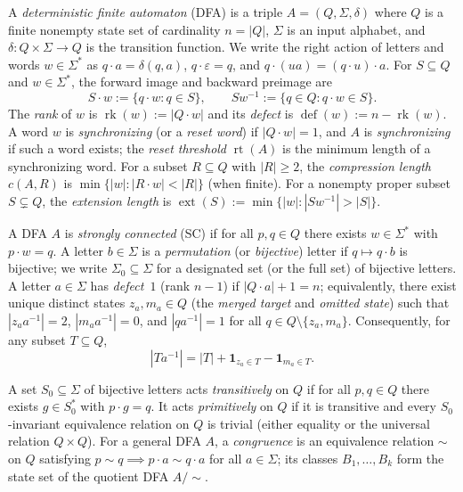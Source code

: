 \documentclass[11pt,a4paper]{article}
\theoremstyle{definition}
\theoremstyle{remark}
\newcommand{\rt}{\operatorname{rt}}
\newcommand{\ext}{\operatorname{ext}}
\newcommand{\rk}{\operatorname{rk}}
\newcommand{\defct}{\operatorname{def}}
\newcommand{\one}{\mathbf{1}}
\begin{document}
A \emph{deterministic finite automaton} (DFA) is a triple $A = (Q, \Sigma, \delta)$ where $Q$ is a finite nonempty state set of cardinality $n = |Q|$, $\Sigma$ is an input alphabet, and $\delta : Q \times \Sigma \to Q$ is the transition function. We write the right action of letters and words $w \in \Sigma^*$ as $q \cdot a = \delta(q, a)$, $q \cdot \varepsilon = q$, and $q \cdot (ua) = (q \cdot u) \cdot a$. For $S \subseteq Q$ and $w \in \Sigma^*$, the forward image and backward preimage are
\[
  S \cdot w := \{q \cdot w : q \in S\}, \qquad S w^{-1} := \{q \in Q : q \cdot w \in S\}.
\]
The \emph{rank} of $w$ is $\rk(w) := |Q \cdot w|$ and its \emph{defect} is $\defct(w) := n - \rk(w)$. A word $w$ is \emph{synchronizing} (or a \emph{reset word}) if $|Q \cdot w| = 1$, and $A$ is \emph{synchronizing} if such a word exists; the \emph{reset threshold} $\rt(A)$ is the minimum length of a synchronizing word. For a subset $R \subseteq Q$ with $|R| \ge 2$, the \emph{compression length} $c(A, R)$ is $\min\{|w| : |R \cdot w| < |R|\}$ (when finite). For a nonempty proper subset $S \subsetneq Q$, the \emph{extension length} is $\ext(S) := \min\{|w| : |S w^{-1}| > |S|\}$.

A DFA $A$ is \emph{strongly connected} (SC) if for all $p, q \in Q$ there exists $w \in \Sigma^*$ with $p \cdot w = q$. A letter $b \in \Sigma$ is a \emph{permutation} (or \emph{bijective}) letter if $q \mapsto q \cdot b$ is bijective; we write $\Sigma_0 \subseteq \Sigma$ for a designated set (or the full set) of bijective letters. A letter $a \in \Sigma$ has \emph{defect~$1$} (rank $n - 1$) if $|Q \cdot a| + 1 = n$; equivalently, there exist unique distinct states $z_a, m_a \in Q$ (the \emph{merged target} and \emph{omitted state}) such that $|z_a a^{-1}| = 2$, $|m_a a^{-1}| = 0$, and $|q a^{-1}| = 1$ for all $q \in Q \setminus \{z_a, m_a\}$. Consequently, for any subset $T \subseteq Q$,
\begin{equation}\label{eq:defect1-preimage}
  |T a^{-1}| = |T| + \one_{z_a \in T} - \one_{m_a \in T}.
\end{equation}

A set $S_0 \subseteq \Sigma$ of bijective letters acts \emph{transitively} on $Q$ if for all $p, q \in Q$ there exists $g \in S_0^*$ with $p \cdot g = q$. It acts \emph{primitively} on $Q$ if it is transitive and every $S_0$-invariant equivalence relation on $Q$ is trivial (either equality or the universal relation $Q \times Q$). For a general DFA $A$, a \emph{congruence} is an equivalence relation $\sim$ on $Q$ satisfying $p \sim q \implies p \cdot a \sim q \cdot a$ for all $a \in \Sigma$; its classes $B_1, \dots, B_k$ form the state set of the quotient DFA $A/\sim$.
\end{document}
